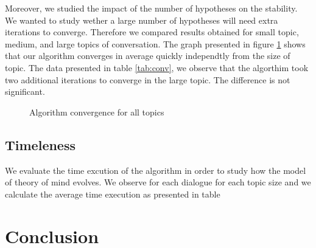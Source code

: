 \documentclass[sigconf]{aamas}  %
\begin{document}
	Moreover, we studied the impact of the number of hypotheses on the stability. We wanted to study wether a large number of hypotheses will need extra iterations to converge. Therefore we compared results obtained for small topic, medium, and large topics of conversation. The graph presented in figure \ref{converge} shows that our algorithm converges in average quickly independtly from the size of topic. The data presented in table \ref{tab:conv}, we observe that the algorthim took two additional iterations to converge in the large topic. The difference is not significant.
	
	
		\begin{figure}[]
			\caption{Algorithm convergence for all topics} 
			\label{converge}
		\end{figure}
	
	
	\subsection{Timeleness}
	We evaluate the time excution of the algorithm in order to study how the model of theory of mind evolves. We observe for each dialogue for each topic size and we calculate the average time execution as presented in table 
%	

	\section{Conclusion}
	
	
\end{document}
